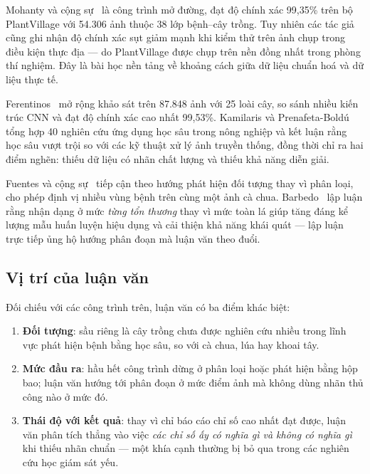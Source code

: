 Mohanty và cộng sự~\cite{mohanty2016plantdisease} là công trình mở đường, đạt độ
chính xác 99,35\% trên bộ PlantVillage với 54.306 ảnh thuộc 38 lớp bệnh--cây
trồng. Tuy nhiên các tác giả cũng ghi nhận độ chính xác sụt giảm mạnh khi kiểm
thử trên ảnh chụp trong điều kiện thực địa --- do PlantVillage được chụp trên nền
đồng nhất trong phòng thí nghiệm. Đây là bài học nền tảng về khoảng cách giữa dữ
liệu chuẩn hoá và dữ liệu thực tế.

Ferentinos~\cite{ferentinos2018plantdisease} mở rộng khảo sát trên 87.848 ảnh với
25 loài cây, so sánh nhiều kiến trúc CNN và đạt độ chính xác cao nhất 99,53\%.
Kamilaris và Prenafeta-Boldú~\cite{kamilaris2018survey} tổng hợp 40 nghiên cứu
ứng dụng học sâu trong nông nghiệp và kết luận rằng học sâu vượt trội so với các
kỹ thuật xử lý ảnh truyền thống, đồng thời chỉ ra hai điểm nghẽn: thiếu dữ liệu
có nhãn chất lượng và thiếu khả năng diễn giải.

Fuentes và cộng sự~\cite{fuentes2017tomato} tiếp cận theo hướng phát hiện đối
tượng thay vì phân loại, cho phép định vị nhiều vùng bệnh trên cùng một ảnh cà
chua. Barbedo~\cite{barbedo2019lesions} lập luận rằng nhận dạng ở mức
\emph{từng tổn thương} thay vì mức toàn lá giúp tăng đáng kể lượng mẫu huấn luyện
hiệu dụng và cải thiện khả năng khái quát --- lập luận trực tiếp ủng hộ hướng
phân đoạn mà luận văn theo đuổi.

\subsection{Vị trí của luận văn}

Đối chiếu với các công trình trên, luận văn có ba điểm khác biệt:

\begin{enumerate}
    \item \textbf{Đối tượng}: sầu riêng là cây trồng chưa được nghiên cứu nhiều
          trong lĩnh vực phát hiện bệnh bằng học sâu, so với cà chua, lúa hay
          khoai tây.
    \item \textbf{Mức đầu ra}: hầu hết công trình dừng ở phân loại hoặc phát hiện
          bằng hộp bao; luận văn hướng tới phân đoạn ở mức điểm ảnh mà không dùng
          nhãn thủ công nào ở mức đó.
    \item \textbf{Thái độ với kết quả}: thay vì chỉ báo cáo chỉ số cao nhất đạt
          được, luận văn phân tích thẳng vào việc \emph{các chỉ số ấy có nghĩa gì
          và không có nghĩa gì} khi thiếu nhãn chuẩn --- một khía cạnh thường bị
          bỏ qua trong các nghiên cứu học giám sát yếu.
\end{enumerate}

